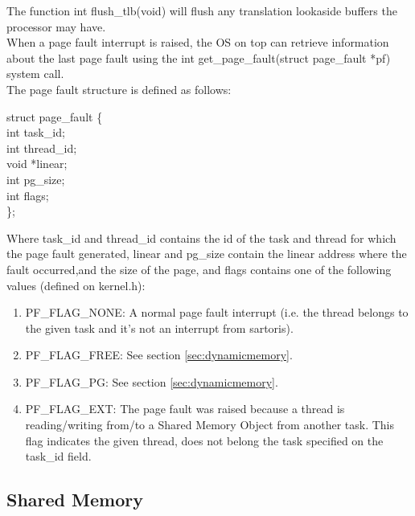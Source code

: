 \documentclass[11pt, letterpaper, twoside, english]{book}
\begin{document}
The function \textsf{int flush\_tlb(void)} will flush any translation lookaside buffers the processor may have.\\

When a page fault interrupt is raised, the OS on top can retrieve information about the last page fault using the \textsf{int get\_page\_fault(struct page\_fault *pf)} system call.\\
The page fault structure is defined as follows:\\

\begin{sf} 
\noindent struct page\_fault \{\\
\indent int task\_id; \\
\indent int thread\_id; \\
\indent void *linear; \\
\indent int pg\_size; \\
\indent int flags; \\
\}; \\
\end{sf}

Where \textsf{task\_id} and \textsf{thread\_id} contains the id of the task and thread for which the page fault generated, \textsf{linear} and \textsf{pg\_size} contain the linear address where the fault occurred,and the size of the page, and \textsf{flags} contains one of the following values (defined on \textsf{kernel.h}):

\begin{enumerate}
\item[] \textsf{PF\_FLAG\_NONE}: A normal page fault interrupt (i.e. the thread belongs to the given task and it's not an interrupt from sartoris).
\item[] \textsf{PF\_FLAG\_FREE}: See section \ref{sec:dynamicmemory}.
\item[] \textsf{PF\_FLAG\_PG}: See section \ref{sec:dynamicmemory}.
\item[] \textsf{PF\_FLAG\_EXT}: The page fault was raised because a thread is reading/writing from/to a Shared Memory Object from another task. This flag indicates the given thread, does not belong the task specified on the \textsf{task\_id} field.
\end{enumerate}

\subsection{Shared Memory} \label{sec:sharedmemory}
\end{document}
